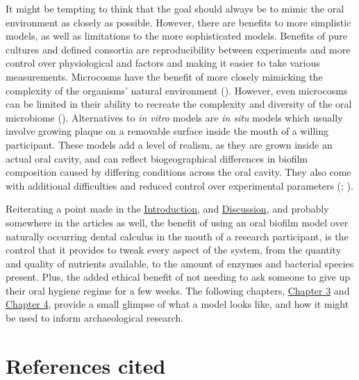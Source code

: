 \documentclass[
  b5paper,
]{book}
\begin{document}
It might be tempting to think that the goal should always be to mimic
the oral environment as closely as possible. However, there are benefits
to more simplistic models, as well as limitations to the more
sophisticated models. Benefits of pure cultures and defined consortia
are reproducibility between experiments and more control over
physiological and factors and making it easier to take various
measurements. Microcosms have the benefit of more closely mimicking the
complexity of the organisms' natural environment
(). However, even
microcosms can be limited in their ability to recreate the complexity
and diversity of the oral microbiome
(). Alternatives to
\emph{in vitro} models are \emph{in situ} models which usually involve
growing plaque on a removable surface inside the mouth of a willing
participant. These models add a level of realism, as they are grown
inside an actual oral cavity, and can reflect biogeographical
differences in biofilm composition caused by differing conditions across
the oral cavity. They also come with additional difficulties and reduced
control over experimental parameters
(;
).

Reiterating a point made in the \hyperref[chap-intro]{Introduction}, and
\hyperref[chap-discussion]{Discussion}, and probably somewhere in the
articles as well, the benefit of using an oral biofilm model over
naturally occurring dental calculus in the mouth of a research
participant, is the control that it provides to tweak every aspect of
the system, from the quantity and quality of nutrients available, to the
amount of enzymes and bacterial species present. Plus, the added ethical
benefit of not needing to ask someone to give up their oral hygiene
regime for a few weeks. The following chapters,
\hyperref[byoc-valid]{Chapter 3} and \hyperref[byoc-starch]{Chapter 4},
provide a small glimpse of what a model looks like, and how it might be
used to inform archaeological research.

\section*{References cited}\label{references-cited-1}

\end{document}
